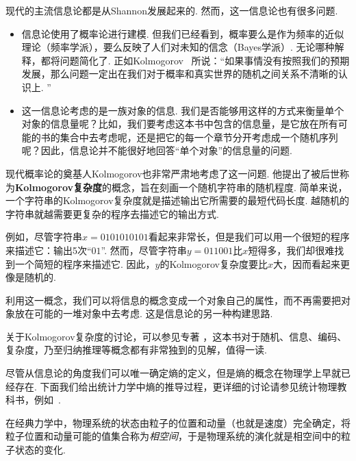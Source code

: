 \begin{remark}
现代的主流信息论都是从Shannon发展起来的. 然而，这一信息论也有很多问题. 
\begin{itemize}
    \item 信息论使用了概率论进行建模. 但我们已经看到，概率要么是作为频率的近似理论（频率学派），要么反映了人们对未知的信念（Bayes学派）. 无论哪种解释，都将问题简化了. 正如Kolmogorov~\cite{kolmogorovLogicalFoundationsProbability1983} 所说：“如果事情没有按照我们的预期发展，那么问题一定出在我们对于概率和真实世界的随机之间关系不清晰的认识上. ”
    \item 这一信息论考虑的是一族对象的信息. 我们是否能够用这样的方式来衡量单个对象的信息量呢？比如，我们要考虑这本书中包含的信息量，是它放在所有可能的书的集合中去考虑呢，还是把它的每一个章节分开考虑成一个随机序列呢？因此，信息论并不能很好地回答“单个对象”的信息量的问题. 
\end{itemize}

现代概率论的奠基人Kolmogorov也非常严肃地考虑了这一问题. 他提出了被后世称为\textbf{Kolmogorov复杂度}的概念，旨在刻画一个随机字符串的随机程度. 简单来说，一个字符串的Kolmogorov复杂度就是描述输出它所需要的最短代码长度. 越随机的字符串就越需要更复杂的程序去描述它的输出方式. 

例如，尽管字符串$x=0101010101$看起来非常长，但是我们可以用一个很短的程序来描述它：输出5次“$01$”. 然而，尽管字符串$y=011001$比$x$短得多，我们却很难找到一个简短的程序来描述它. 因此，$y$的Kolmogorov复杂度要比$x$大，因而看起来更像是随机的.

利用这一概念，我们可以将信息的概念变成一个对象自己的属性，而不再需要把对象放在可能的一堆对象中去考虑. 这是信息论的另一种构建思路. 


关于Kolmogorov复杂度的讨论，可以参见专著 \cite{liIntroductionKolmogorovComplexity2019}，这本书对于随机、信息、编码、复杂度，乃至归纳推理等概念都有非常独到的见解，值得一读. 
\end{remark}

尽管从信息论的角度我们可以唯一确定熵的定义，但是熵的概念在物理学上早就已经存在. 下面我们给出统计力学中熵的推导过程，更详细的讨论请参见统计物理教科书，例如~\cite{tolmanPrinciplesStatisticalMechanics2010}.

在经典力学中，物理系统的状态由粒子的位置和动量（也就是速度）完全确定，将粒子位置和动量可能的值集合称为\textit{相空间}，于是物理系统的演化就是相空间中的粒子状态的变化. 

